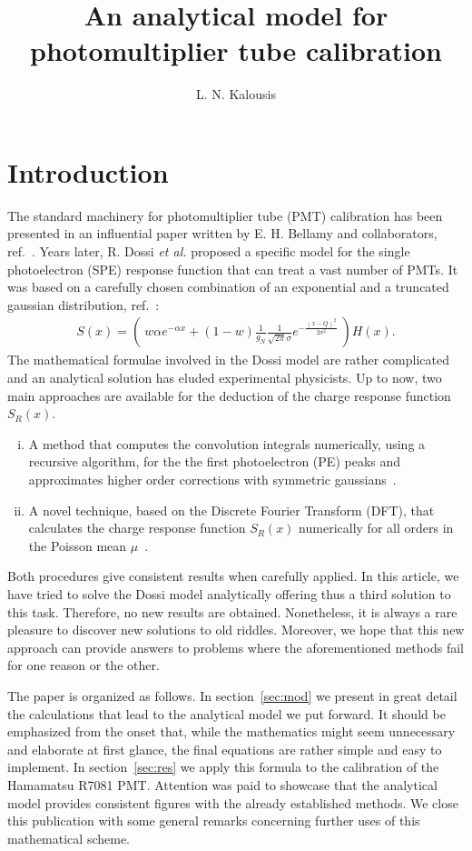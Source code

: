 \documentclass[a4paper,11pt]{article}
\title{\boldmath An analytical model for photomultiplier tube calibration}
\author[a]{L. N. Kalousis}
\affiliation[a]{Physics Department, National Technical University, 157 80 Zografou, Athens, Greece}
\begin{document}
\maketitle
\flushbottom

\section{Introduction}
\label{sec:intro}
% 

The standard machinery for photomultiplier tube (PMT) calibration has been presented in an influential paper written by E. H. Bellamy and collaborators, ref.~\cite{bellamy}. 
Years later, R. Dossi \emph{et al.} proposed a specific model for the single photoelectron (SPE) response function that can treat a vast number of PMTs. 
It was based on a carefully chosen combination of an exponential and a truncated gaussian distribution, ref.~\cite{dossi}:
\begin{align}
S(x) =    \left( \ w \alpha e^{-\alpha x } + (1-w)\frac{1}{g_N} \frac{1}{\sqrt{2\pi}\sigma} e^{ - \frac{( x - Q )^2}{2\sigma^2}} \ \right) H(x).       \label{eq:S}
\end{align}
The mathematical formulae involved in the Dossi model are rather complicated and an analytical solution has eluded experimental physicists. 
Up to now, two main approaches are available for the deduction of the charge response function $S_R(x)$.
\begin{enumerate}[i.]
\item  A method that computes the convolution integrals numerically, using a recursive algorithm, 
for the the first photoelectron (PE) peaks and approximates higher order corrections with symmetric gaussians~\cite{dossi,darkside}. 
\item A novel technique, based on the Discrete Fourier Transform (DFT), that calculates the charge response function $S_R(x)$ numerically for all orders in the Poisson mean $\mu$~\cite{me2}. 
\end{enumerate}
Both procedures give consistent results when carefully applied. 
In this article, we have tried to solve the Dossi model analytically offering thus a third solution to this task. 
Therefore, no new results are obtained. Nonetheless, it is always a rare pleasure to discover new solutions to old riddles. 
Moreover, we hope that this new approach can provide answers to problems where the aforementioned methods fail for one reason or the other. 

The paper is organized as follows. 
In section~\ref{sec:mod} we present in great detail the calculations that lead to the analytical model we put forward. 
It should be emphasized from the onset that, while the mathematics might seem unnecessary and elaborate at first glance, the final equations are rather simple and easy to implement. 
In section~\ref{sec:res} we apply this formula to the calibration of the Hamamatsu R7081 PMT. 
Attention was paid to showcase that the analytical model provides consistent figures with the already established methods. 
We close this publication with some general remarks concerning further uses of this mathematical scheme. 
\end{document}
